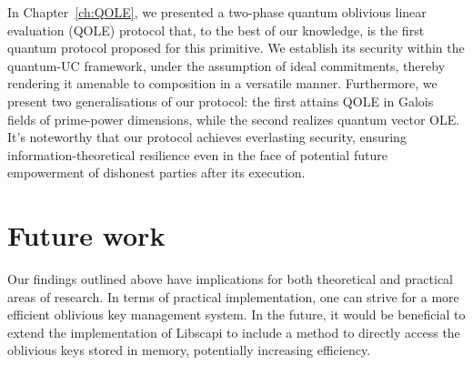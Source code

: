 In Chapter~\ref{ch:QOLE}, we presented a two-phase quantum oblivious linear evaluation (QOLE) protocol that, to the best of our knowledge, is the first quantum protocol proposed for this primitive. We establish its security within the quantum-UC framework, under the assumption of ideal commitments, thereby rendering it amenable to composition in a versatile manner. Furthermore, we present two generalisations of our protocol: the first attains QOLE in Galois fields of prime-power dimensions, while the second realizes quantum vector OLE. It's noteworthy that our protocol achieves everlasting security, ensuring information-theoretical resilience even in the face of potential future empowerment of dishonest parties after its execution.

\section{Future work}

Our findings outlined above have implications for both theoretical and practical areas of research. In terms of practical implementation, one can strive for a more efficient oblivious key management system. %
In the future, it would be beneficial to extend the implementation of Libscapi to include a method to directly access the oblivious keys stored in memory, potentially increasing efficiency.

